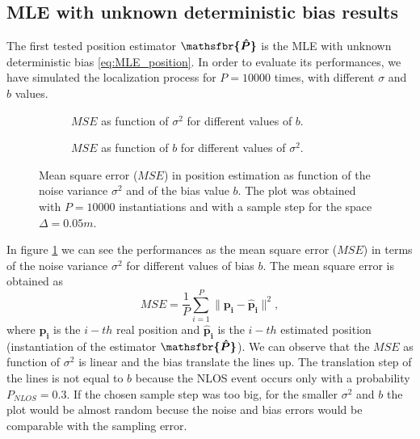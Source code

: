 \documentclass[%
    twoside, 
    a4paper
    ]{article}
\DeclareRobustCommand{\msf}[1]{%
  \ifcat\noexpand#1\relax\msfgreek{#1}\else\mathsfbr{#1}\fi%
}
\begin{document}
    \subsection{MLE with unknown deterministic bias results}
    The first tested position estimator $\bm{\msf{\hat{P}}}$ is the MLE with unknown deterministic 
    bias \ref{eq:MLE_position}.
    In order to evaluate its performances, we have simulated the localization process for $P=10000$
    times, with different $\sigma$ and $b$ values.
    \begin{figure}[t]
        \centering
        \begin{subfigure}[t]{0.49\linewidth}
            
            \caption{$MSE$ as function of $\sigma^2$ for different values of $b$.}
            \label{fig:MSE_deterministicb}
        \end{subfigure}
        \hfill
        \begin{subfigure}[t]{0.49\linewidth}
            \centering
            
            \caption{$MSE$ as function of $b$ for different values of $\sigma^2$.}
            \label{fig:MSE_funcb_deterministicb}
        \end{subfigure}
        \caption{Mean square error ($MSE$) in position estimation as function of the noise variance 
        $\sigma^2$ and of the bias value $b$. The plot was obtained with $P=10000$ instantiations and 
        with a sample step for the space $\Delta = 0.05 \si{m}$.}
    \end{figure}

    In figure \ref{fig:MSE_deterministicb} we can see the performances as the mean square error ($MSE$)
    in terms of the noise variance $\sigma^2$ for different values of bias $b$. The mean square error
    is obtained as 
    \begin{equation}
        MSE = \frac{1}{P} \sum_{i=1}^P \lVert \bm{p_i} - \bm{\hat{p}_i} \rVert^2,
        \label{eq:MSE}
    \end{equation}
    where $\bm{p_i}$ is the $i-th$ real position and $\bm{\hat{p}_i}$ is the $i-th$ estimated 
    position (instantiation of the estimator $\bm{\msf{\hat{P}}}$).
    We can observe that the $MSE$ as function of $\sigma^2$ is linear and the bias translate the 
    lines up. The translation step of the lines is not equal to $b$ because the NLOS event occurs 
    only with a probability $P_{NLOS} = 0.3$.
    If the chosen sample step was too big, for the smaller $\sigma^2$ and $b$ the plot would be 
    almost random becuse the noise and bias errors would be comparable with the sampling error.
\end{document}
